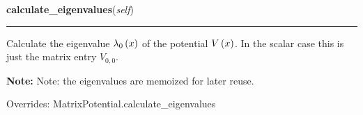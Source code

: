     \vspace{0.5ex}

\hspace{.8\funcindent}\begin{boxedminipage}{\funcwidth}

    \raggedright \textbf{calculate\_eigenvalues}(\textit{self})

    \vspace{-1.5ex}

    \rule{\textwidth}{0.5\fboxrule}
\setlength{\parskip}{2ex}
    Calculate the eigenvalue
    $\lambda_0\left( x \right)$ of the potential
    $V\left( x \right)$. In the scalar case this is just the
    matrix entry $V_{0,0}$.

\setlength{\parskip}{1ex}

\textbf{Note:} Note: the eigenvalues are memoized for later reuse.

      Overrides: MatrixPotential.calculate\_eigenvalues

    \end{boxedminipage}

    \vspace{0.5ex}

